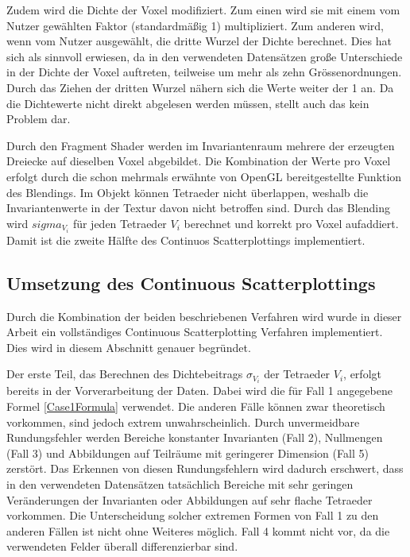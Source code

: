 \documentclass[a4paper,fontsize=12pt,toc=bib,halfparskip]{scrartcl}
\begin{document}
Zudem wird die Dichte der Voxel modifiziert. Zum einen wird sie mit einem vom Nutzer gew\"ahlten Faktor (standardm\"a{\ss}ig 1) multipliziert. Zum anderen wird, wenn vom Nutzer ausgew\"ahlt, die dritte Wurzel der Dichte berechnet. Dies hat sich als sinnvoll erwiesen, da in den verwendeten Datens\"atzen gro{\ss}e Unterschiede in der Dichte der Voxel auftreten, teilweise um mehr als zehn Gr\"o{ss}enordnungen. Durch das Ziehen der dritten Wurzel n\"ahern sich die Werte weiter der 1 an. Da die Dichtewerte nicht direkt abgelesen werden m\"ussen, stellt auch das kein Problem dar. 

Durch den Fragment Shader werden im Invariantenraum mehrere der erzeugten Dreiecke auf dieselben Voxel abgebildet. Die Kombination der Werte pro Voxel erfolgt durch die schon mehrmals erw\"ahnte von OpenGL bereitgestellte Funktion des Blendings. Im Objekt k\"onnen Tetraeder nicht \"uberlappen, weshalb die Invariantenwerte in der Textur davon nicht betroffen sind. Durch das Blending wird $sigma_{V_i}$ f\"ur jeden Tetraeder $V_i$ berechnet und korrekt pro Voxel aufaddiert. Damit ist die zweite H\"alfte des Continuos Scatterplottings implementiert.

\subsection{Umsetzung des Continuous Scatterplottings}
\label{CSPImplementation}
Durch die Kombination der beiden beschriebenen Verfahren wird wurde in dieser Arbeit ein vollst\"andiges Continuous Scatterplotting Verfahren implementiert. Dies wird in diesem Abschnitt genauer begr\"undet.

Der erste Teil, das Berechnen des Dichtebeitrags $\sigma_{V_i}$ der Tetraeder $V_i$, erfolgt bereits in der Vorverarbeitung der Daten. Dabei wird die f\"ur Fall 1 angegebene Formel \ref{Case1Formula} verwendet. Die anderen F\"alle k\"onnen zwar theoretisch vorkommen, sind jedoch extrem unwahrscheinlich. Durch unvermeidbare Rundungsfehler werden Bereiche konstanter Invarianten (Fall 2), Nullmengen (Fall 3) und Abbildungen auf Teilr\"aume mit geringerer Dimension (Fall 5) zerst\"ort. Das Erkennen von diesen Rundungsfehlern wird dadurch erschwert, dass in den verwendeten Datens\"atzen tats\"achlich Bereiche mit sehr geringen Ver\"anderungen der Invarianten oder Abbildungen auf sehr flache Tetraeder vorkommen. Die Unterscheidung solcher extremen Formen von Fall 1 zu den anderen F\"allen ist nicht ohne Weiteres m\"oglich. Fall 4 kommt nicht vor, da die verwendeten Felder \"uberall differenzierbar sind.
\end{document}
